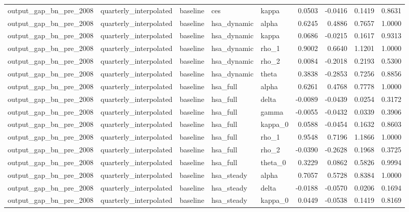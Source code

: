 \begin{tabular}{lllllrrrr}
output\_gap\_bn\_pre\_2008 & quarterly\_interpolated & baseline & ces & kappa & 0.0503 & -0.0416 & 0.1419 & 0.8631 \\
output\_gap\_bn\_pre\_2008 & quarterly\_interpolated & baseline & hsa\_dynamic & alpha & 0.6245 & 0.4886 & 0.7657 & 1.0000 \\
output\_gap\_bn\_pre\_2008 & quarterly\_interpolated & baseline & hsa\_dynamic & kappa & 0.0686 & -0.0215 & 0.1617 & 0.9313 \\
output\_gap\_bn\_pre\_2008 & quarterly\_interpolated & baseline & hsa\_dynamic & rho\_1 & 0.9002 & 0.6640 & 1.1201 & 1.0000 \\
output\_gap\_bn\_pre\_2008 & quarterly\_interpolated & baseline & hsa\_dynamic & rho\_2 & 0.0084 & -0.2018 & 0.2193 & 0.5300 \\
output\_gap\_bn\_pre\_2008 & quarterly\_interpolated & baseline & hsa\_dynamic & theta & 0.3838 & -0.2853 & 0.7256 & 0.8856 \\
output\_gap\_bn\_pre\_2008 & quarterly\_interpolated & baseline & hsa\_full & alpha & 0.6261 & 0.4768 & 0.7778 & 1.0000 \\
output\_gap\_bn\_pre\_2008 & quarterly\_interpolated & baseline & hsa\_full & delta & -0.0089 & -0.0439 & 0.0254 & 0.3172 \\
output\_gap\_bn\_pre\_2008 & quarterly\_interpolated & baseline & hsa\_full & gamma & -0.0055 & -0.0432 & 0.0339 & 0.3906 \\
output\_gap\_bn\_pre\_2008 & quarterly\_interpolated & baseline & hsa\_full & kappa\_0 & 0.0588 & -0.0454 & 0.1632 & 0.8603 \\
output\_gap\_bn\_pre\_2008 & quarterly\_interpolated & baseline & hsa\_full & rho\_1 & 0.9548 & 0.7196 & 1.1866 & 1.0000 \\
output\_gap\_bn\_pre\_2008 & quarterly\_interpolated & baseline & hsa\_full & rho\_2 & -0.0390 & -0.2628 & 0.1968 & 0.3725 \\
output\_gap\_bn\_pre\_2008 & quarterly\_interpolated & baseline & hsa\_full & theta\_0 & 0.3229 & 0.0862 & 0.5826 & 0.9994 \\
output\_gap\_bn\_pre\_2008 & quarterly\_interpolated & baseline & hsa\_steady & alpha & 0.7057 & 0.5728 & 0.8384 & 1.0000 \\
output\_gap\_bn\_pre\_2008 & quarterly\_interpolated & baseline & hsa\_steady & delta & -0.0188 & -0.0570 & 0.0206 & 0.1694 \\
output\_gap\_bn\_pre\_2008 & quarterly\_interpolated & baseline & hsa\_steady & kappa\_0 & 0.0449 & -0.0538 & 0.1419 & 0.8169 \\

\end{tabular}
